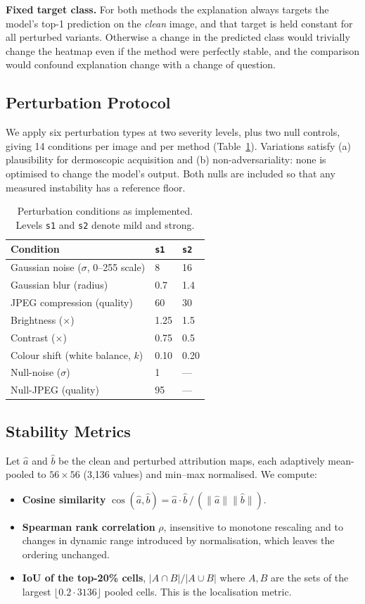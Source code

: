 \documentclass[conference]{IEEEtran}
\begin{document}
\textbf{Fixed target class.} For both methods the explanation always targets
the model's top-1 prediction on the \emph{clean} image, and that target is
held constant for all perturbed variants. Otherwise a change in
the predicted class would trivially change the heatmap even if the method
were perfectly stable, and the comparison would confound explanation change with
a change of question.

\subsection{Perturbation Protocol}
We apply six perturbation types at two severity levels, plus two null
controls, giving 14 conditions per image and per method
(Table~\ref{tab:perturb}). Variations satisfy (a) plausibility for
dermoscopic acquisition and (b) non-adversariality: none is optimised to
change the model's output. Both nulls are included so that any measured
instability has a reference floor.

\begin{table}[t]
\caption{Perturbation conditions as implemented. Levels \texttt{s1} and
\texttt{s2} denote mild and strong.}
\label{tab:perturb}
\centering
\small
\begin{tabular}{lll}
\toprule
Condition & \texttt{s1} & \texttt{s2} \\
\midrule
Gaussian noise ($\sigma$, 0--255 scale) & 8 & 16 \\
Gaussian blur (radius) & 0.7 & 1.4 \\
JPEG compression (quality) & 60 & 30 \\
Brightness ($\times$) & 1.25 & 1.5 \\
Contrast ($\times$) & 0.75 & 0.5 \\
Colour shift (white balance, $k$) & 0.10 & 0.20 \\
Null-noise ($\sigma$) & 1 & --- \\
Null-JPEG (quality) & 95 & --- \\
\bottomrule
\end{tabular}
\end{table}

\subsection{Stability Metrics}
Let $\hat{a}$ and $\hat{b}$ be the clean and perturbed attribution maps, each adaptively
mean-pooled to $56\times56$ (3{,}136 values) and min--max normalised. We
compute:
\begin{itemize}
\item \textbf{Cosine similarity}
$\cos(\hat{a},\hat{b}) = \hat{a}\!\cdot\!\hat{b} \,/\, (\|\hat{a}\|\|\hat{b}\|)$.
\item \textbf{Spearman rank correlation} $\rho$, insensitive to monotone
rescaling and to changes in dynamic range introduced by normalisation, which
leaves the ordering unchanged.
\item \textbf{IoU of the top-20\% cells}, $\lvert A\cap B\rvert/\lvert A\cup
B\rvert$ where $A,B$ are the sets of the largest $\lfloor 0.2\cdot3136
\rfloor$ pooled cells. This is the localisation metric.
\end{itemize}
\end{document}
